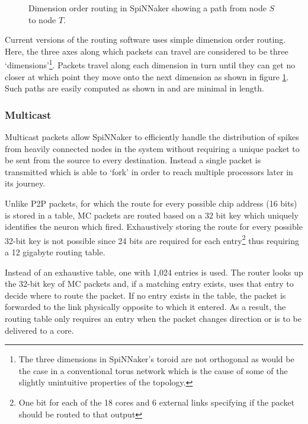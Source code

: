 				\begin{figure}
					\center
					
					\caption[Dimension order routing in SpiNNaker.]{Dimension order routing
					in SpiNNaker showing a path from node $S$ to node $T$.}
					\label{fig:dimension-order-routing}
				\end{figure}
				
				Current versions of the routing software uses simple dimension order
				routing. Here, the three axes along which packets can travel are
				considered to be three `dimensions'\footnote{The three dimensions in
				SpiNNaker's toroid are not orthogonal as would be the case in a
				conventional torus network which is the cause of some of the slightly
				unintuitive properties of the topology.}. Packets travel along each
				dimension in turn until they can get no closer at which point they move
				onto the next dimension as shown in figure
				\ref{fig:dimension-order-routing}. Such paths are easily computed as
				shown in \cite{nocetti02} and are minimal in length.
			
			\subsubsection{Multicast}
				
				
				Multicast packets allow SpiNNaker to efficiently handle the distribution
				of spikes from heavily connected nodes in the system without requiring a
				unique packet to be sent from the source to every destination. Instead a
				single packet is transmitted which is able to `fork' in order to reach
				multiple processors later in its journey.
				
				Unlike P2P packets, for which the route for every possible chip address
				(16 bits) is stored in a table, MC packets are routed based on a 32 bit
				key which uniquely identifies the neuron which fired. Exhaustively
				storing the route for every possible 32-bit key is not possible since 24
				bits are required for each entry\footnote{One bit for each of the 18
				cores and 6 external links specifying if the packet should be routed to
				that output} thus requiring a 12 gigabyte routing table.
				
				Instead of an exhaustive table, one with 1,024 entries is used. The
				router looks up the 32-bit key of MC packets and, if a matching entry
				exists, uses that entry to decide where to route the packet. If no entry
				exists in the table, the packet is forwarded to the link physically
				opposite to which it entered. As a result, the routing table only
				requires an entry when the packet changes direction or is to be
				delivered to a core.
				
